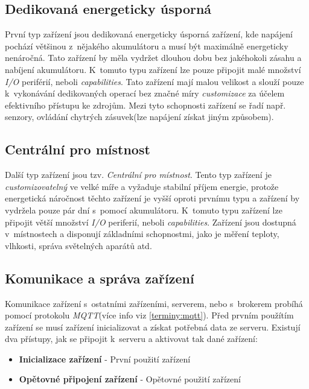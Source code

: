 \subsection*{Dedikovaná energeticky úsporná}
\label{hardware:usporna}
První typ zařízení jsou dedikovaná energeticky úsporná zařízení, kde napájení pochází většinou z~nějakého akumulátoru a musí být maximálně energeticky nenáročná.
Tato zařízení by měla vydržet dlouhou dobu bez jakéhokoli zásahu a nabíjení akumulátoru.
K~tomuto typu zařízení lze pouze připojit malé množství \emph{I/O} periférií, neboli \emph{capabilities}.
Tato zařízení mají malou velikost a slouží pouze k~vykonávání dedikovaných operací bez značné míry \emph{customizace} za účelem efektivního přístupu ke zdrojům.
Mezi tyto schopnosti zařízení se řadí např. senzory, ovládání chytrých zásuvek(lze napájení získat jiným způsobem).

\subsection*{Centrální pro místnost}
\label{hardware:centralni}
Další typ zařízení jsou tzv. \emph{Centrální pro místnost}.
Tento typ zařízení je \emph{customizovatelný} ve velké míře a vyžaduje stabilní příjem energie, protože energetická náročnost těchto zařízení je vyšší oproti prvnímu typu a zařízení by vydržela pouze pár dní s~pomocí akumulátoru.
K~tomuto typu zařízení lze připojit větší množství \emph{I/O} periferií, neboli \emph{capabilities}.
Zařízení jsou dostupná v~místnostech a disponují základními schopnostmi, jako je měření teploty, vlhkosti, správa světelných aparátů atd.

\newpage
\subsection*{Komunikace a správa zařízení}
\label{hardware:komunikace}

Komunikace zařízení s~ostatními zařízeními, serverem, nebo s~brokerem probíhá pomocí protokolu \emph{MQTT}(více info viz \ref{terminy:mqtt}).
Před prvním použítím zařízení se musí zařízení inicializovat a získat potřebná data ze serveru.
Existují dva přístupy, jak se připojit k~serveru a aktivovat tak dané zařízení:
\begin{itemize}
  \item \textbf{Inicializace zařízení} - První použití zařízení
  \item \textbf{Opětovné připojení zařízení} - Opětovné použití zařízení
\end{itemize}

